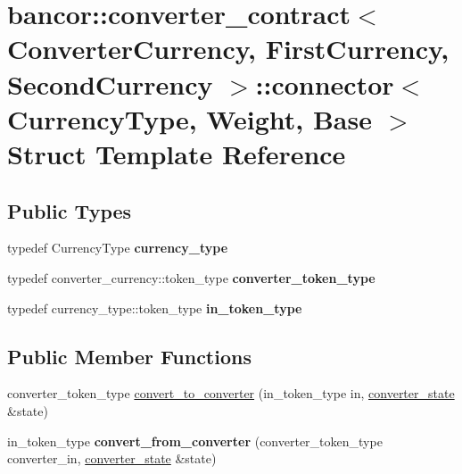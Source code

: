 \hypertarget{structbancor_1_1converter__contract_1_1connector}{}\section{bancor\+:\+:converter\+\_\+contract$<$ Converter\+Currency, First\+Currency, Second\+Currency $>$\+:\+:connector$<$ Currency\+Type, Weight, Base $>$ Struct Template Reference}
\label{structbancor_1_1converter__contract_1_1connector}
\subsection*{Public Types}
\begin{DoxyCompactItemize}
\item 
\mbox{\label{structbancor_1_1converter__contract_1_1connector_a0ed25c1ccaf3a9f6d45f8960f55ec2df}} 
typedef Currency\+Type {\bfseries currency\+\_\+type}
\item 
\mbox{\label{structbancor_1_1converter__contract_1_1connector_a69e701c71ae753f70771703badc0e9ae}} 
typedef converter\+\_\+currency\+::token\+\_\+type {\bfseries converter\+\_\+token\+\_\+type}
\item 
\mbox{\label{structbancor_1_1converter__contract_1_1connector_af66116d51aa7c41f03ee1abfc21cb51e}} 
typedef currency\+\_\+type\+::token\+\_\+type {\bfseries in\+\_\+token\+\_\+type}
\end{DoxyCompactItemize}
\subsection*{Public Member Functions}
\begin{DoxyCompactItemize}
\item 
converter\+\_\+token\+\_\+type \mbox{\hyperlink{structbancor_1_1converter__contract_1_1connector_a64f2755a7c9e6a66742af82ebf601421}{convert\+\_\+to\+\_\+converter}} (in\+\_\+token\+\_\+type in, \mbox{\hyperlink{structbancor_1_1converter__contract_1_1converter__state}{converter\+\_\+state}} \&state)
\item 
\mbox{\label{structbancor_1_1converter__contract_1_1connector_a33dd73e69a5ba381f7112f91ba5a047d}} 
in\+\_\+token\+\_\+type {\bfseries convert\+\_\+from\+\_\+converter} (converter\+\_\+token\+\_\+type converter\+\_\+in, \mbox{\hyperlink{structbancor_1_1converter__contract_1_1converter__state}{converter\+\_\+state}} \&state)
\end{DoxyCompactItemize}


